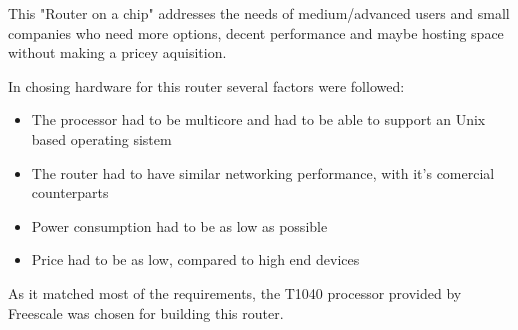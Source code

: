 This "Router on a chip" addresses the needs of medium/advanced
users and small companies who need more options, decent performance and
maybe hosting space without making a pricey aquisition.

In chosing hardware for this router several factors were followed:
\begin{itemize}
	\item The processor had to be multicore and had to be able
	to support an Unix based operating sistem
	\item The router had to have similar networking performance, with
	it's comercial counterparts
	\item Power consumption had to be as low as possible
	\item Price had to be as low, compared to high end devices
\end{itemize}

As it matched most of the requirements, the T1040 processor provided by
Freescale was chosen for building this router.

